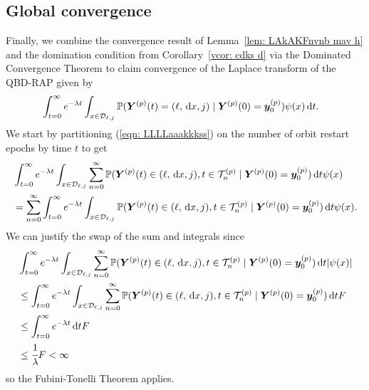 \subsection{Global convergence}\label{sec: sub global}
Finally, we combine the convergence result of Lemma~\ref{lem: LAkAKFnvnb mav h} and the domination condition from Corollary~\ref{vcor: cdks d} via the Dominated Convergence Theorem to claim convergence of the Laplace transform of the QBD-RAP given by 
\begin{align}
	&\int_{t=0}^\infty e^{-\lambda t}\int_{x\in\mathcal D_{\ell,j}}\mathbb P( {\boldsymbol Y}^{(p)}(t) = (\ell,\, \mathrm{d} x,j)\mid \boldsymbol Y^{(p)}(0)=\boldsymbol y_0^{(p)})  \psi(x)\, \mathrm{d} t. \label{eqn: LLLLaaakkkss}
\end{align}
We start by partitioning (\ref{eqn: LLLLaaakkkss}) on the number of orbit restart epochs by time \(t\) to get
\begin{align}
	& \int_{t=0}^\infty e^{-\lambda t}\int_{x\in\mathcal D_{\ell,j}}\sum_{n=0}^\infty \mathbb P(  {\boldsymbol Y}^{(p)}(t) \in (\ell, \, \mathrm{d} x, j), t\in\mathcal T_n^{(p)} \mid\nonumber 
	\boldsymbol Y^{(p)}(0)=\boldsymbol y_0^{(p)})\, \mathrm{d} t \psi(x) \nonumber
	\\&=\sum_{n=0}^\infty\int_{t=0}^\infty e^{-\lambda t}\int_{x\in\mathcal D_{\ell,j}} \mathbb P( {\boldsymbol Y}^{(p)}(t) \in (\ell, \, \mathrm{d} x, j), t\in\mathcal T_n^{(p)} \mid  
	\boldsymbol Y^{(p)}(0)=\boldsymbol y_0^{(p)})\, \mathrm{d} t \psi(x). \label{eqn: KLDNVnav}
\end{align}
We can justify the swap of the sum and integrals since 
\begin{align}
	& \int_{t=0}^\infty e^{-\lambda t}\int_{x\in\mathcal D_{\ell,j}}\sum_{n=0}^\infty \mathbb P(  {\boldsymbol Y}^{(p)}(t) \in (\ell, \, \mathrm{d} x, j), t\in\mathcal T_n^{(p)} \mid\nonumber 
	\boldsymbol Y^{(p)}(0)=\boldsymbol y_0^{(p)})\, \mathrm{d} t |\psi(x)| \nonumber
	\\&\leq \int_{t=0}^\infty e^{-\lambda t}\int_{x\in\mathcal D_{\ell,j}}\sum_{n=0}^\infty \mathbb P(  {\boldsymbol Y}^{(p)}(t) \in (\ell, \, \mathrm{d} x, j), t\in\mathcal T_n^{(p)} \mid\nonumber 
	\boldsymbol Y^{(p)}(0)=\boldsymbol y_0^{(p)})\, \mathrm{d} t F \nonumber
	\\&\leq \int_{t=0}^\infty e^{-\lambda t}\, \mathrm{d} t F \nonumber
	\\&\leq \cfrac{1}{\lambda} F<\infty \nonumber
\end{align}
so the Fubini-Tonelli Theorem applies.

